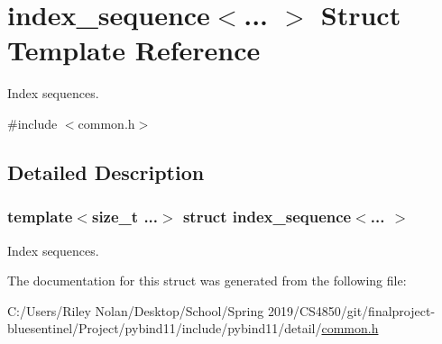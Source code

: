\hypertarget{structindex__sequence}{}\section{index\+\_\+sequence$<$... $>$ Struct Template Reference}
\label{structindex__sequence}


Index sequences.  




{\ttfamily \#include $<$common.\+h$>$}



\subsection{Detailed Description}
\subsubsection*{template$<$size\+\_\+t ...$>$\newline
struct index\+\_\+sequence$<$... $>$}

Index sequences. 

The documentation for this struct was generated from the following file\+:\begin{DoxyCompactItemize}
\item 
C\+:/\+Users/\+Riley Nolan/\+Desktop/\+School/\+Spring 2019/\+C\+S4850/git/finalproject-\/bluesentinel/\+Project/pybind11/include/pybind11/detail/\mbox{\hyperlink{detail_2common_8h}{common.\+h}}\end{DoxyCompactItemize}
